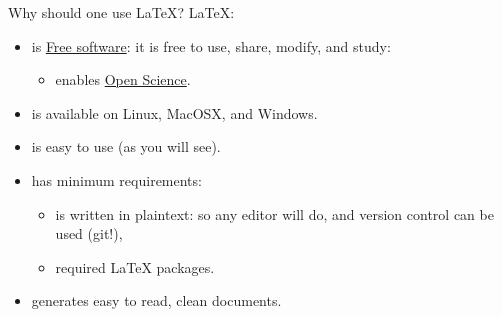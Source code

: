 \documentclass[usenames,dvipsnames]{beamer}
\begin{document}
\begin{frame}[c]{Why should one use \LaTeX{}?}
  \LaTeX{}:
  \begin{itemize}
    \item is \href{https://u.fsf.org/user-liberation}{Free software}: it is free to use, share, modify, and study:
      \begin{itemize}
        \item enables \href{https://en.wikipedia.org/wiki/Open_science}{Open Science}.
      \end{itemize}
    \item is available on Linux, MacOSX, and Windows.
    \item is easy to use (as you will see).
      \pause{}
    \item has minimum requirements:
      \begin{itemize}
        \item is written in \alert{plaintext}: so \alert{any} editor will do, and \alert{version control} can be used (git!),
        \item required \LaTeX{} packages.
      \end{itemize}
      \pause{}
    \item generates easy to read, clean documents\footnotemark.
  \end{itemize}
\end{frame}
\end{document}
